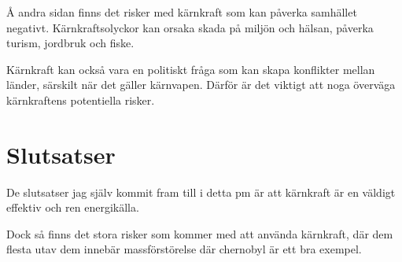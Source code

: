 \documentclass[11p]{article}
\begin{document}
    Å andra sidan finns det risker med kärnkraft som kan påverka samhället negativt. Kärnkraftsolyckor kan orsaka skada på miljön och hälsan, påverka turism, jordbruk och fiske.

    Kärnkraft kan också vara en politiskt fråga som kan skapa konflikter mellan länder, särskilt när det gäller kärnvapen. Därför är det viktigt att noga överväga kärnkraftens potentiella risker.
\parencite{Nationalgeographic}

    \section{Slutsatser}
    De slutsatser jag själv kommit fram till i detta pm är att kärnkraft är en väldigt effektiv och ren energikälla.


    Dock så finns det stora risker som kommer med att använda kärnkraft, där dem flesta utav dem innebär massförstörelse där chernobyl är ett bra exempel.


\end{document}
